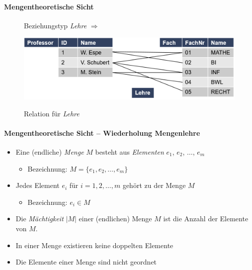 \begin{frame}{\insertsection}
\framesubtitle{Mengentheoretische Sicht}
	\begin{figure}
		Beziehungstyp \emph{Lehre} $\Rightarrow$
		\begin{minipage}{0.4\linewidth}    	
 	    \includegraphics[scale=0.35]{img/ERM-BeispielRelationLehreProfessorFach.png}
 	  \end{minipage} 
    \quad Relation f\"ur \emph{Lehre}
 	\end{figure}    
\end{frame}

\begin{frame}{\insertsection}
\framesubtitle{Mengentheoretische Sicht -- Wiederholung Mengenlehre}
\begin{itemize}
 \item Eine (endliche) \emph{Menge} $M$ besteht aus \emph{Elementen} $e_1$, $e_2$, $\ldots$, $e_m$
   \begin{itemize}
	   \item Bezeichnung: $M=\{e_1, e_2,\ldots , e_m\}$
	 \end{itemize}
 \item Jedes Element $e_i$ f\"ur $i= 1, 2,\ldots,m$ geh\"ort zu der Menge $M$
   \begin{itemize}
   	\item Bezeichnung: $e_i\in M$
   \end{itemize}
 \item Die \emph{M\"achtigkeit} $\vert M\vert$ einer (endlichen) Menge $M$ ist die Anzahl der Elemente von $M$.
\end{itemize}
\onslide\pause 
\abs\abs
{}
\begin{itemize}
	\item In einer Menge existieren keine doppelten Elemente
	\item Die Elemente einer Menge sind nicht geordnet
\end{itemize}
\end{frame}

